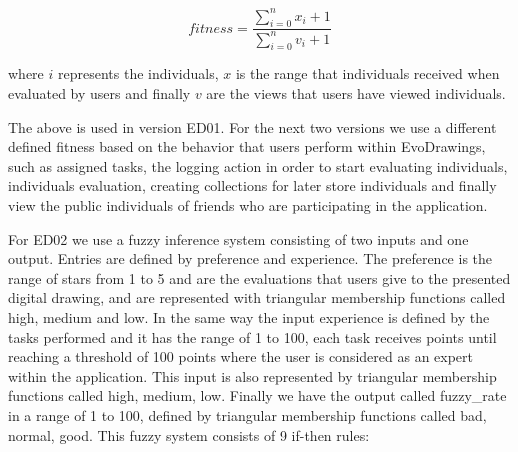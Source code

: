 \begin{equation}\label{eq:fitfunc01}
\displaystyle fitness=\frac{\sum_{i=0}^{n}x_{i}+ 1}{\sum_{i=0}^{n}v_{i} + 1}
\end{equation}

where $i$ represents the individuals,
$x$ is the range that individuals received when evaluated by users and finally
$v$ are the views that users have viewed individuals.

The above is used in version ED01. For the next two versions we use a different
defined fitness based on the behavior that users perform within EvoDrawings,
such as assigned tasks, the logging action in order to start evaluating
individuals, individuals evaluation, creating collections for later store
individuals and finally view the public individuals of friends who are
participating in the application.

For ED02 we use a fuzzy inference system consisting of two inputs and one
output. Entries are defined by preference and experience. The preference is the
range of stars from 1 to 5 and are the evaluations that users give to the
presented digital drawing, and are represented with triangular membership
functions called high, medium and low. In the same way the input experience is
defined by the tasks performed and it has the range of 1 to 100, each task
receives points until reaching a threshold of 100 points where the user is
considered as an expert within the application. This input is also represented
by triangular membership functions called high, medium, low. Finally we have the
output called fuzzy\_rate in a range of 1 to 100, defined by triangular
membership functions called bad, normal, good. This fuzzy system consists of 9
if-then rules:

